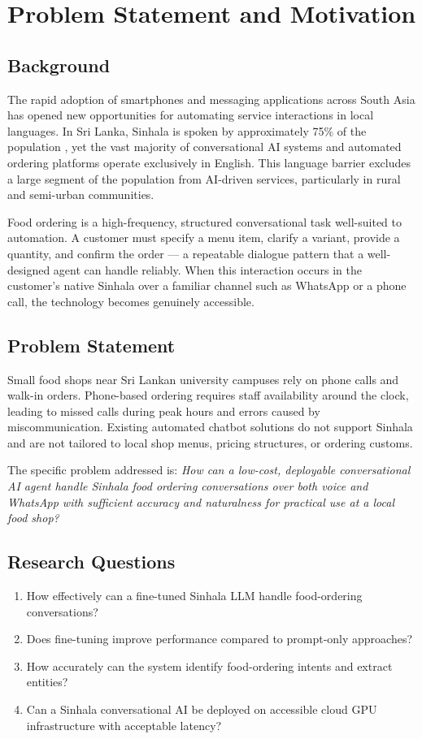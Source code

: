 \documentclass[12pt,a4paper]{report}
\begin{document}
\chapter{Problem Statement and Motivation}

\section{Background}
The rapid adoption of smartphones and messaging applications across South Asia has opened new opportunities for automating service interactions in local languages. In Sri Lanka, Sinhala is spoken by approximately 75\% of the population \cite{ethnologue2024}, yet the vast majority of conversational AI systems and automated ordering platforms operate exclusively in English. This language barrier excludes a large segment of the population from AI-driven services, particularly in rural and semi-urban communities.

Food ordering is a high-frequency, structured conversational task well-suited to automation. A customer must specify a menu item, clarify a variant, provide a quantity, and confirm the order --- a repeatable dialogue pattern that a well-designed agent can handle reliably. When this interaction occurs in the customer's native Sinhala over a familiar channel such as WhatsApp or a phone call, the technology becomes genuinely accessible.

\section{Problem Statement}
Small food shops near Sri Lankan university campuses rely on phone calls and walk-in orders. Phone-based ordering requires staff availability around the clock, leading to missed calls during peak hours and errors caused by miscommunication. Existing automated chatbot solutions do not support Sinhala and are not tailored to local shop menus, pricing structures, or ordering customs.

The specific problem addressed is: \textit{How can a low-cost, deployable conversational AI agent handle Sinhala food ordering conversations over both voice and WhatsApp with sufficient accuracy and naturalness for practical use at a local food shop?}

\section{Research Questions}
\begin{enumerate}
    \item How effectively can a fine-tuned Sinhala LLM handle food-ordering conversations?
    \item Does fine-tuning improve performance compared to prompt-only approaches?
    \item How accurately can the system identify food-ordering intents and extract entities?
    \item Can a Sinhala conversational AI be deployed on accessible cloud GPU infrastructure with acceptable latency?
\end{enumerate}
\end{document}
